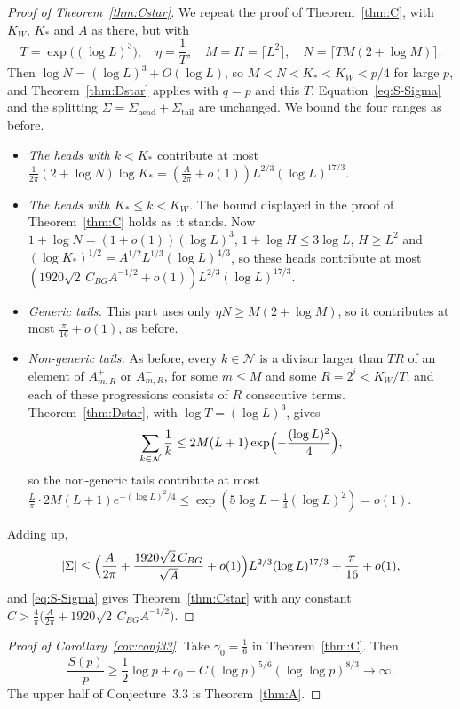 \begin{proof}[Proof of Theorem~\ref{thm:Cstar}]
We repeat the proof of Theorem~\ref{thm:C}, with $K_W$, $K_*$ and $A$ as there, but with
\[
T=\exp\bigl((\log L)^3\bigr),\quad\eta=\frac1T,\quad M=H=\lceil L^2\rceil,\quad N=\bigl\lceil TM(2+\log M)\bigr\rceil.
\]
Then $\log N=(\log L)^3+O(\log L)$, so $M<N<K_*<K_W<p/4$ for large $p$, and Theorem~\ref{thm:Dstar} applies with $q=p$
and this $T$. Equation~\eqref{eq:S-Sigma} and the splitting $\Sigma=\Sigma_{\mathrm{head}}+\Sigma_{\mathrm{tail}}$ are
unchanged. We bound the four ranges as before.
\begin{itemize}[leftmargin=*]
\item \emph{The heads with $k<K_*$} contribute at most
$\frac1{2\pi}(2+\log N)\log K_*=(\frac A{2\pi}+o(1))L^{2/3}(\log L)^{17/3}$.
\item \emph{The heads with $K_*\le k<K_W$.} The bound displayed in the proof of Theorem~\ref{thm:C} holds as it stands.
Now $1+\log N=(1+o(1))(\log L)^3$, $1+\log H\le3\log L$, $H\ge L^2$ and
$(\log K_*)^{1/2}=A^{1/2}L^{1/3}(\log L)^{4/3}$, so these heads contribute at most
$(1920\sqrt2\,C_{BG}A^{-1/2}+o(1))L^{2/3}(\log L)^{17/3}$.
\item \emph{Generic tails.} This part uses only $\eta N\ge M(2+\log M)$, so it contributes at most $\frac\pi{16}+o(1)$, as
before.
\item \emph{Non-generic tails.} As before, every $k\in\mathcal{N}$ is a divisor larger than $TR$ of an element of
$A^+_{m,R}$ or $A^-_{m,R}$, for some $m\le M$ and some $R=2^i<K_W/T$; and each of these progressions consists of $R$
consecutive terms. Theorem~\ref{thm:Dstar}, with $\log T=(\log L)^3$, gives
\[
\sum_{k\in\mathcal{N}}\frac1k\le2M(L+1)\exp\Bigl(-\frac{(\log L)^2}4\Bigr),
\]
so the non-generic tails contribute at most $\frac L\pi\cdot2M(L+1)e^{-(\log L)^2/4}\le
\exp(5\log L-\frac14(\log L)^2)=o(1)$.
\end{itemize}
Adding up,
\[
|\Sigma|\le\Bigl(\frac A{2\pi}+\frac{1920\sqrt2\,C_{BG}}{\sqrt A}+o(1)\Bigr)L^{2/3}(\log L)^{17/3}+\frac\pi{16}+o(1),
\]
and \eqref{eq:S-Sigma} gives Theorem~\ref{thm:Cstar} with any constant
$C>\frac4\pi\bigl(\frac A{2\pi}+1920\sqrt2\,C_{BG}A^{-1/2}\bigr)$.
\end{proof}

\begin{proof}[Proof of Corollary~\ref{cor:conj33}]
Take $\gamma_0=\frac16$ in Theorem~\ref{thm:C}. Then
\[
\frac{S(p)}p\ge\frac12\log p+c_0-C(\log p)^{5/6}(\log\log p)^{8/3}\longrightarrow\infty.
\]
The upper half of Conjecture~3.3 is Theorem~\ref{thm:A}.
\end{proof}

